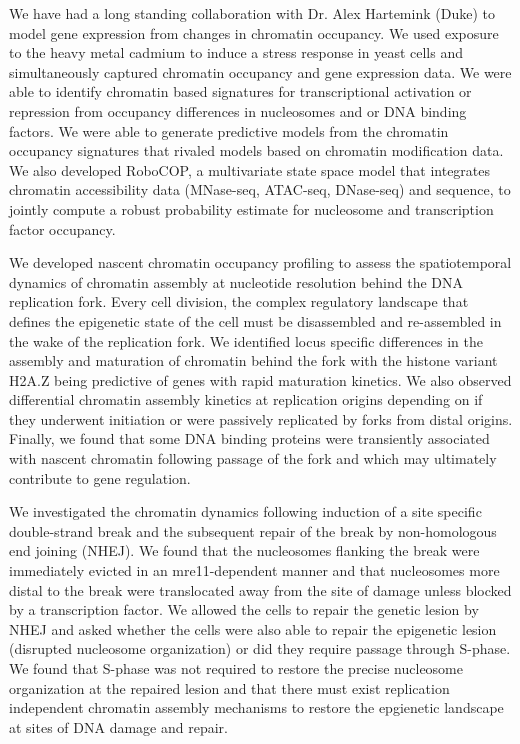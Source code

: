 We have had a long standing collaboration with Dr. Alex Hartemink (Duke) to model gene expression from changes in chromatin occupancy. We used exposure to the heavy metal cadmium to induce a stress response in yeast cells and simultaneously captured chromatin occupancy and gene expression data. We were able to identify chromatin based signatures for transcriptional activation or repression from occupancy differences in nucleosomes and or DNA binding factors\citep{}. We were able to generate predictive models from the chromatin occupancy signatures that rivaled models based on chromatin modification data.  We also developed RoboCOP, a multivariate state space model that integrates chromatin accessibility data (MNase-seq, ATAC-seq, DNase-seq) and sequence, to jointly compute a robust probability estimate for nucleosome and transcription factor occupancy\citep{}. 

We developed nascent chromatin occupancy profiling to assess the spatiotemporal dynamics of chromatin assembly at nucleotide resolution behind the DNA replication fork.  Every cell division, the complex regulatory landscape that defines the epigenetic state of the cell must be disassembled and re-assembled in the wake of the replication fork.  We identified locus specific differences in the assembly and maturation of chromatin behind the fork with the histone variant H2A.Z being predictive of genes with rapid maturation kinetics.   We also observed differential chromatin assembly kinetics at replication origins depending on if they underwent initiation or were passively replicated by forks from distal origins. Finally, we found that some DNA binding proteins were transiently associated with nascent chromatin following passage of the fork and which may ultimately contribute to gene regulation.

We investigated the chromatin dynamics following induction of a site specific double-strand break and the subsequent repair of the break by non-homologous end joining (NHEJ).  We found that the nucleosomes flanking the break were immediately evicted in an mre11-dependent manner and that nucleosomes more distal to the break were translocated away from the site of damage unless blocked by a transcription factor.  We allowed the cells to repair the genetic lesion by NHEJ and asked whether the cells were also able to repair the epigenetic lesion (disrupted nucleosome organization) or did they require passage through S-phase.  We found that S-phase was not required to restore the precise nucleosome organization at the repaired lesion and that there must exist replication independent chromatin assembly mechanisms to restore the epgienetic landscape at sites of DNA damage and repair.


